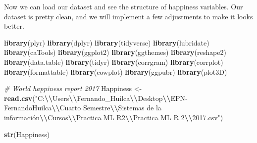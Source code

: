 \documentclass[
]{article}
\newenvironment{Shaded}{\begin{snugshade}}{\end{snugshade}}
\newcommand{\CommentTok}[1]{\textcolor[rgb]{0.56,0.35,0.01}{\textit{#1}}}
\newcommand{\FunctionTok}[1]{\textcolor[rgb]{0.13,0.29,0.53}{\textbf{#1}}}
\newcommand{\NormalTok}[1]{#1}
\newcommand{\OtherTok}[1]{\textcolor[rgb]{0.56,0.35,0.01}{#1}}
\newcommand{\SpecialCharTok}[1]{\textcolor[rgb]{0.81,0.36,0.00}{\textbf{#1}}}
\newcommand{\StringTok}[1]{\textcolor[rgb]{0.31,0.60,0.02}{#1}}
\begin{document}
Now we can load our dataset and see the structure of happiness
variables. Our dataset is pretty clean, and we will implement a few
adjustments to make it looks better.

\begin{Shaded}
\begin{Highlighting}[]
\FunctionTok{library}\NormalTok{(plyr)}
\FunctionTok{library}\NormalTok{(dplyr)}
\FunctionTok{library}\NormalTok{(tidyverse)}
\FunctionTok{library}\NormalTok{(lubridate)}
\FunctionTok{library}\NormalTok{(caTools)}
\FunctionTok{library}\NormalTok{(ggplot2)}
\FunctionTok{library}\NormalTok{(ggthemes)}
\FunctionTok{library}\NormalTok{(reshape2)}
\FunctionTok{library}\NormalTok{(data.table)}
\FunctionTok{library}\NormalTok{(tidyr)}
\FunctionTok{library}\NormalTok{(corrgram)       }
\FunctionTok{library}\NormalTok{(corrplot)}
\FunctionTok{library}\NormalTok{(formattable)}
\FunctionTok{library}\NormalTok{(cowplot)}
\FunctionTok{library}\NormalTok{(ggpubr)}
\FunctionTok{library}\NormalTok{(plot3D)}
\end{Highlighting}
\end{Shaded}

\begin{Shaded}
\begin{Highlighting}[]
\CommentTok{\# World happiness report 2017}
\NormalTok{Happiness }\OtherTok{\textless{}{-}} \FunctionTok{read.csv}\NormalTok{(}\StringTok{"C:}\SpecialCharTok{\textbackslash{}\textbackslash{}}\StringTok{Users}\SpecialCharTok{\textbackslash{}\textbackslash{}}\StringTok{Fernando\_Huilca}\SpecialCharTok{\textbackslash{}\textbackslash{}}\StringTok{Desktop}\SpecialCharTok{\textbackslash{}\textbackslash{}}\StringTok{EPN{-}FernandoHuilca}\SpecialCharTok{\textbackslash{}\textbackslash{}}\StringTok{Cuarto Semestre}\SpecialCharTok{\textbackslash{}\textbackslash{}}\StringTok{Sistemas de la información}\SpecialCharTok{\textbackslash{}\textbackslash{}}\StringTok{Cursos}\SpecialCharTok{\textbackslash{}\textbackslash{}}\StringTok{Practica ML R2}\SpecialCharTok{\textbackslash{}\textbackslash{}}\StringTok{Practica ML R 2}\SpecialCharTok{\textbackslash{}\textbackslash{}}\StringTok{2017.csv"}\NormalTok{)}

\FunctionTok{str}\NormalTok{(Happiness)}
\end{Highlighting}
\end{Shaded}
\end{document}
